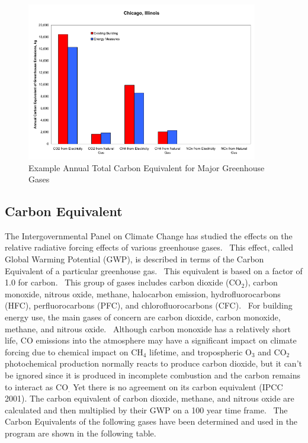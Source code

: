 \begin{figure}[hbtp] %
\centering
\includegraphics[width=0.9\textwidth, height=0.9\textheight, keepaspectratio=true]{media/image7911.svg.png}
\caption{  Example Annual Total Carbon Equivalent for Major Greenhouse Gases \protect \label{fig:example-annual-total-carbon-equivalent-for}}
\end{figure}

\subsection{Carbon Equivalent}\label{carbon-equivalent}

The Intergovernmental Panel on Climate Change has studied the effects on the relative radiative forcing effects of various greenhouse gases.~ This effect, called Global Warming Potential (GWP), is described in terms of the Carbon Equivalent of a particular greenhouse gas.~ This equivalent is based on a factor of 1.0 for carbon.~ This group of gases includes carbon dioxide (CO\(_{2}\)), carbon monoxide, nitrous oxide, methane, halocarbon emission, hydrofluorocarbons (HFC), perfluorocarbons (PFC), and chlorofluorocarbons (CFC).~ For building energy use, the main gases of concern are carbon dioxide, carbon monoxide, methane, and nitrous oxide.~ Although carbon monoxide has a relatively short life, CO emissions into the atmosphere may have a significant impact on climate forcing due to chemical impact on CH\(_{4}\) lifetime, and tropospheric O\(_{3}\) and CO\(_{2}\) photochemical production normally reacts to produce carbon dioxide, but it can't be ignored since it is produced in incomplete combustion and the carbon remains to interact as CO\(_{.}\) Yet there is no agreement on its carbon equivalent (IPCC 2001). The carbon equivalent of carbon dioxide, methane, and nitrous oxide are calculated and then multiplied by their GWP on a 100 year time frame.~ The Carbon Equivalents of the following gases have been determined and used in the program are shown in the following table.


